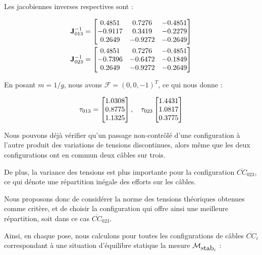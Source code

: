 Les jacobiennes inverses respectives sont :

\begin{equation}
\begin{split}
{\bf J}^{-1}_{013} = 
\begin{bmatrix}
0.4851 & 0.7276 & -0.4851 \\
-0.9117 & 0.3419 & -0.2279 \\
0.2649 & -0.9272 & -0.2649
\end{bmatrix}\\
{\bf J}^{-1}_{023} = 
\begin{bmatrix}
0.4851 & 0.7276 & -0.4851 \\
-0.7396 & -0.6472 & -0.1849 \\
0.2649 & -0.9272 & -0.2649
\end{bmatrix}
\end{split}
\label{chap03:eq05}
\end{equation}

En posant $m = 1/g$, nous avons \boldmath ${\mathcal F} = (0, 0, -1)^T$, ce 
qui nous donne :

\begin{equation}
{\bf \tau}_{013} = 
\begin{bmatrix}
1.0308 \\
0.8775 \\
1.1325
\end{bmatrix},
\quad
{\bf \tau}_{023}
\begin{bmatrix}
1.4431 \\
1.0817 \\
0.3775
\end{bmatrix}
\label{chap03:eq06}
\end{equation}

Nous pouvons d\'ej\`a v\'erifier qu'un passage non-contr\^ol\'e d'une 
configuration \`a l'autre produit des variations de tensions discontinues, 
alors m\^eme que les deux configurations ont en commun deux c\^ables sur trois.

De plus, la variance des tensions est plus importante pour la 
configuration $\overline{CC}_{023}$, ce qui dénote une répartition in\'egale 
des efforts sur les câbles.

Nous proposons donc de consid\'erer la norme des tensions th\'eoriques 
obtenues comme critère, et de choisir la configuration qui offre ainsi une meilleure 
r\'epartition, soit dans ce cas $\overline{CC}_{023}$.

Ainsi, en chaque pose, nous calculons pour toutes les configurations de câbles 
$\overline{CC}_i$ correspondant à une situation d'équilibre statique la mesure 
$\mathcal M_{\hbox{stab}_i}$ :

